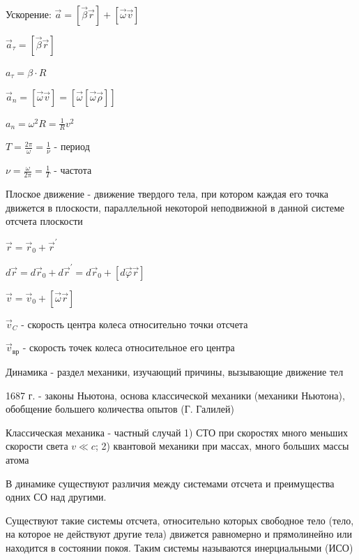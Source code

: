 \documentclass[12pt]{article}
\begin{document}
    Ускорение: $\vec{a} = [\vec{\beta}\vec{r}] + [\vec{\omega}\vec{v}]$

    \begin{multicols}{3}

        $\vec{a}_\tau = [\vec{\beta}\vec{r}]$

        $a_\tau = \beta \cdot R$

        $\vec{a}_n = [\vec{\omega}\vec{v}] = [\vec{\omega}[\vec{\omega}\vec{\rho}]]$

        $a_n = \omega^2 R = \frac{1}{R} v^2$

        $T = \frac{2\pi}{\omega} = \frac{1}{\nu}$ - период

        $\nu = \frac{\omega}{2\pi} = \frac{1}{T}$ - частота

    \end{multicols}

    Плоское движение - движение твердого тела, при котором каждая его точка движется в плоскости,
    параллельной некоторой неподвижной в данной системе отсчета плоскости

    $\vec{r} = \vec{r}_0 + \vec{r}^\prime$

    $d\vec{r} = d\vec{r}_0 + d\vec{r}^\prime = d\vec{r}_0 + [d\vec{\varphi}\vec{r}]$

    $\vec{v} = \vec{v}_0 + [\vec{\omega}\vec{r}]$

    $\vec{v}_C$ - скорость центра колеса относительно точки отсчета

    $\vec{v}_{\text{вр}}$ - скорость точек колеса относительное его центра

    \Def Динамика - раздел механики, изучающий причины, вызывающие движение тел

    1687 г. - законы Ньютона, основа классической механики (механики Ньютона), обобщение большего количества опытов (Г. Галилей)

    Классическая механика - частный случай  1) СТО при скоростях много меньших скорости света $v \ll c$;
    2) квантовой механики при массах, много больших массы атома

    В динамике существуют различия между системами отсчета и преимущества одних СО над другими.

    Существуют такие системы отсчета, относительно которых свободное тело (тело, на которое не действуют другие тела) движется равномерно
    и прямолинейно или находится в состоянии покоя. Таким системы называются инерциальными (ИСО)

%
%
\end{document}
